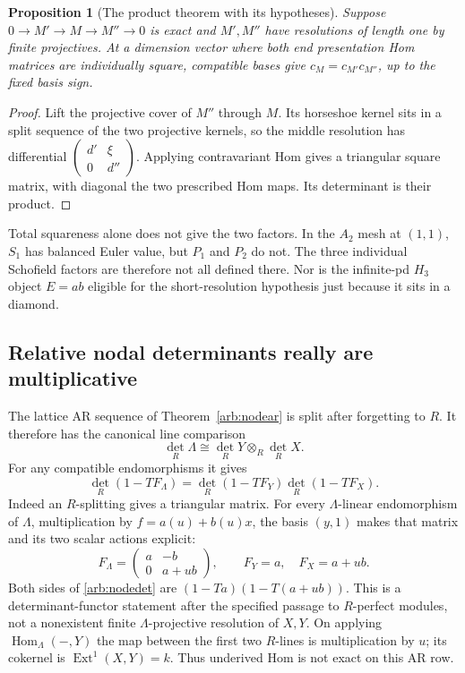\documentclass[11pt,oneside,openany]{book}
\newtheorem{proposition}[theorem]{Proposition}
\theoremstyle{definition}\newtheorem{definition}[theorem]{Definition}
\theoremstyle{remark}\newtheorem{remark}[theorem]{Remark}
\begin{document}
\begin{proposition}[The product theorem with its hypotheses]
Suppose $0\to M'\to M\to M''\to0$ is exact and $M',M''$ have resolutions
of length one by finite projectives. At a dimension vector where both end
presentation Hom matrices are individually square, compatible bases give
$c_M=c_{M'}c_{M''}$, up to the fixed basis sign.
\end{proposition}
\begin{proof}
Lift the projective cover of $M''$ through $M$. Its horseshoe kernel sits in
a split sequence of the two projective kernels, so the middle resolution
has differential $\left(\begin{smallmatrix}d'&\xi\\0&d''\end{smallmatrix}\right)$.
Applying contravariant Hom gives a triangular square matrix, with diagonal
the two prescribed Hom maps. Its determinant is their product.
\end{proof}
Total squareness alone does not give the two factors. In the $A_2$ mesh at
$(1,1)$, $S_1$ has balanced Euler value, but $P_1$ and $P_2$ do not. The
three individual Schofield factors are therefore not all defined there.
Nor is the infinite-pd $H_3$ object $E=ab$ eligible for the short-resolution
hypothesis just because it sits in a diamond.

\subsection{Relative nodal determinants really are multiplicative}
The lattice AR sequence of Theorem~\ref{arb:nodear} is split after forgetting
to $R$. It therefore has the canonical line comparison
\[
 \det_R\Lambda\cong\det_R Y\otimes_R\det_R X.
\]
For any compatible endomorphisms it gives
\begin{equation}\label{arb:nodedet}
 \det_R(1-TF_\Lambda)=\det_R(1-TF_Y)\det_R(1-TF_X).
\end{equation}
Indeed an $R$-splitting gives a triangular matrix. For every $\Lambda$-linear
endomorphism of $\Lambda$, multiplication by $f=a(u)+b(u)x$, the basis
$(y,1)$ makes that matrix and its two scalar actions explicit:
\[
 F_\Lambda=\begin{pmatrix}a&-b\\0&a+ub\end{pmatrix},
 \qquad F_Y=a,\quad F_X=a+ub.
\]
Both sides of \eqref{arb:nodedet} are $(1-Ta)(1-T(a+ub))$.
This is a determinant-functor statement after the specified passage to
$R$-perfect modules, not a nonexistent finite $\Lambda$-projective resolution
of $X,Y$. On applying $\operatorname{Hom}_\Lambda(-,Y)$ the map between
the first two $R$-lines is multiplication by $u$; its cokernel is
$\operatorname{Ext}^1(X,Y)=k$. Thus underived Hom is not exact on this AR row.
\end{document}
